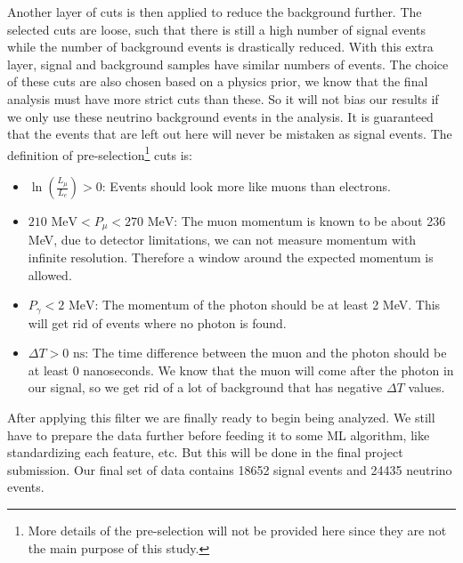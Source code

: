 Another layer of cuts is then applied to reduce the background further. The selected cuts are loose, such that there is still a high number of signal events while the number of background events is drastically reduced. With this extra layer, signal and background samples have similar numbers of events. The choice of these cuts are also chosen based on a physics prior, we know that the final analysis must have more strict cuts than these. So it will not bias our results if we only use these neutrino background events in the analysis. It is guaranteed that the events that are left out here will never be mistaken as signal events. The definition of pre-selection\footnote{More details of the pre-selection will not be provided here since they are not the main purpose of this study.} cuts is:

\begin{itemize} 
\item $\ln{\left(\frac{L_{\mu}}{L_{e}}\right) > 0}$: Events should look more like muons than electrons.
\item $210 \textrm{ MeV} < P_{\mu} < 270 \textrm{ MeV}$: The muon momentum is known to be about 236 MeV, due to detector limitations, we can not measure momentum with infinite resolution. Therefore a window around the expected momentum is allowed.
\item $P_{\gamma} < 2 \textrm{ MeV}$: The momentum of the photon should be at least 2 MeV. This will get rid of events where no photon is found.
\item $\Delta T > 0 \textrm{ ns}$: The time difference between the muon and the photon should be at least 0 nanoseconds. We know that the muon will come after the photon in our signal, so we get rid of a lot of background that has negative $\Delta T$ values.
\end{itemize}

After applying this filter we are finally ready to begin being analyzed. We still have to prepare the data further before feeding it to some ML algorithm, like standardizing each feature, etc. But this will be done in the final project submission. Our final set of data contains 18652 signal events and 24435 neutrino events.